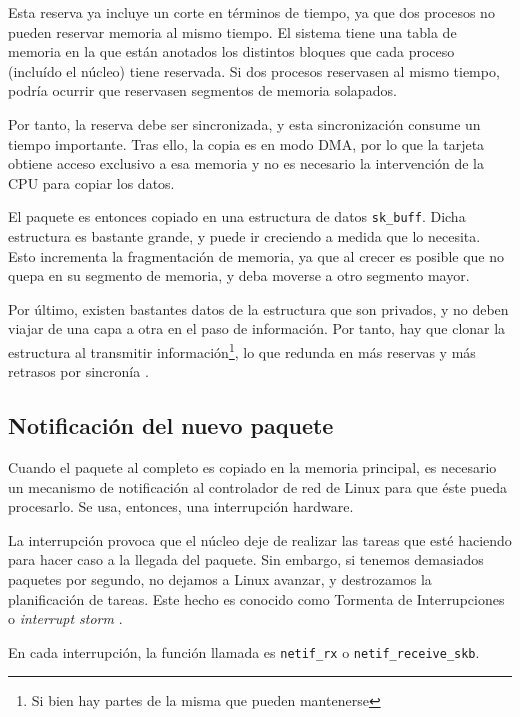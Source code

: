 Esta reserva ya incluye un corte en términos de tiempo, ya que dos procesos no pueden reservar memoria al mismo tiempo. 
El sistema tiene una tabla de memoria en la que están anotados los distintos bloques que cada proceso (incluído el 
núcleo) tiene reservada. Si dos procesos reservasen al mismo tiempo, podría ocurrir que reservasen segmentos de memoria 
solapados.

Por tanto, la reserva debe ser sincronizada, y esta sincronización consume un tiempo importante. Tras ello, la copia es 
en modo \gls{DMA}, por lo que la tarjeta obtiene acceso exclusivo a esa memoria y no es necesario la intervención de la 
CPU para copiar los datos.

El paquete es entonces copiado en una estructura de datos \texttt{sk\_buff}. Dicha estructura es bastante grande, y 
puede ir creciendo a medida que lo necesita. Esto incrementa la fragmentación de memoria, ya que al crecer es posible 
que no quepa en su segmento de memoria, y deba moverse a otro segmento mayor.

Por último, existen bastantes datos de la estructura que son privados, y no deben viajar de una capa a otra en el paso 
de información. Por tanto, hay que clonar la estructura al transmitir información\footnote{Si bien hay partes de la 
misma que pueden mantenerse}, lo que redunda en más reservas y más retrasos por sincronía
\cite{skBuffLinuxFoundation}.

\subsection{Notificación del nuevo paquete}
Cuando el paquete al completo es copiado en la memoria principal, es necesario un mecanismo de notificación al 
\gls{controlador} de red de Linux para que éste pueda procesarlo. Se usa, entonces, 
una interrupción hardware.

La interrupción provoca que el núcleo deje de realizar las tareas que esté haciendo para hacer caso a la llegada del 
paquete. Sin embargo, si tenemos demasiados paquetes por segundo, no dejamos a Linux avanzar, y destrozamos la 
planificación de tareas. Este hecho es conocido como Tormenta de Interrupciones o 
\emph{interrupt storm} \cite{p206}.

En cada interrupción, la función llamada es \texttt{netif\_rx} o \texttt{netif\_receive\_skb}.


